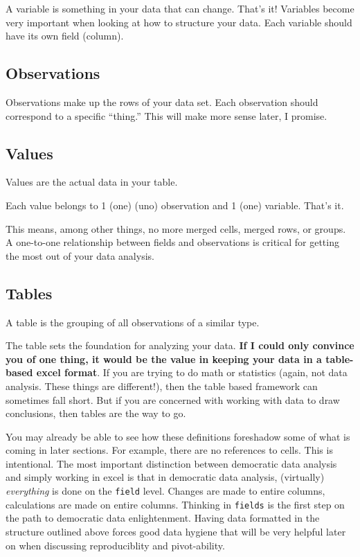 \documentclass[
]{book}
\begin{document}
A variable is something in your data that can change. That's it! Variables become very important when looking at how to structure your data. Each variable should have its own field (column).

\hypertarget{observations}{%
\subsection{Observations}\label{observations}}

Observations make up the rows of your data set. Each observation should correspond to a specific ``thing.'' This will make more sense later, I promise.

\hypertarget{values}{%
\subsection{Values}\label{values}}

Values are the actual data in your table.

Each value belongs to 1 (one) (uno) observation and 1 (one) variable. That's it.

This means, among other things, no more merged cells, merged rows, or groups. A one-to-one relationship between fields and observations is critical for getting the most out of your data analysis.

\hypertarget{tables}{%
\subsection{Tables}\label{tables}}

A table is the grouping of all observations of a similar type.

The table sets the foundation for analyzing your data. \textbf{If I could only convince you of one thing, it would be the value in keeping your data in a table-based excel format}. If you are trying to do math or statistics (again, not data analysis. These things are different!), then the table based framework can sometimes fall short. But if you are concerned with working with data to draw conclusions, then tables are the way to go.

You may already be able to see how these definitions foreshadow some of what is coming in later sections. For example, there are no references to cells. This is intentional. The most important distinction between democratic data analysis and simply working in excel is that in democratic data analysis, (virtually) \emph{everything} is done on the \texttt{field} level. Changes are made to entire columns, calculations are made on entire columns. Thinking in \texttt{fields} is the first step on the path to democratic data enlightenment. Having data formatted in the structure outlined above forces good data hygiene that will be very helpful later on when discussing reproduciblity and pivot-ability.
\end{document}
